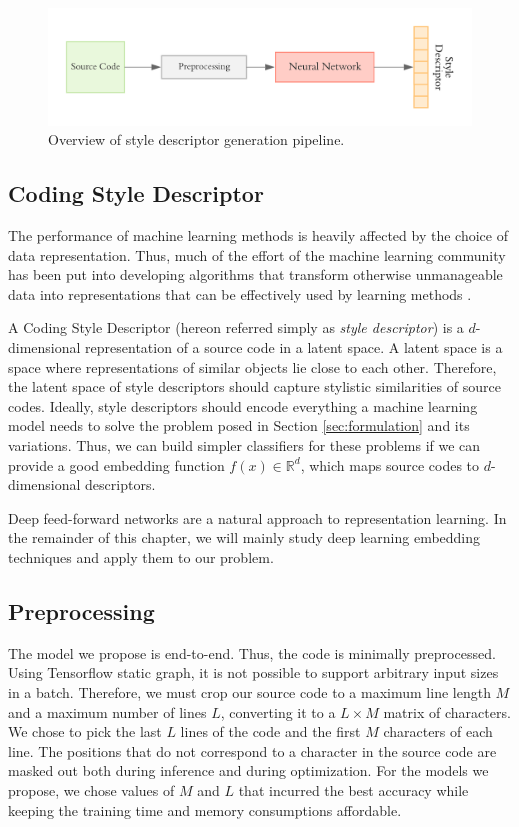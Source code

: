 \begin{figure}[ht]
	\centering
	\includegraphics[width=\linewidth]{imgs/pipeline.pdf}
	\caption{Overview of style descriptor generation pipeline.}
	\label{fig:overall}
\end{figure}

\subsection{Coding Style Descriptor}\label{sec:descriptor}

The performance of machine learning methods is heavily affected by the choice of data representation. Thus, much of the effort of the machine learning community has been put into developing algorithms that transform otherwise unmanageable data into representations that can be effectively used by learning methods \cite{representation_learning}.

A Coding Style Descriptor (hereon referred simply as \textit{style descriptor}) is a $d$-dimensional representation of a source code in a latent space. A latent space is a space where representations of similar objects lie close to each other. Therefore, the latent space of style descriptors should capture stylistic similarities of source codes. Ideally, style descriptors should encode everything a machine learning model needs to solve the problem posed in Section \ref{sec:formulation} and its variations. Thus, we can build simpler classifiers for these problems if we can provide a good embedding function $f(x) \in \mathbb{R}^d$, which maps source codes to $d$-dimensional descriptors.

Deep feed-forward networks are a natural approach to representation learning. In the remainder of this chapter, we will mainly study deep learning embedding techniques and apply them to our problem.

\subsection{Preprocessing}\label{sec:preprocessing}

The model we propose is end-to-end. Thus, the code is minimally preprocessed. Using Tensorflow static graph, it is not possible to support arbitrary input sizes in a batch. Therefore, we must crop our source code to a maximum line length $M$ and a maximum number of lines $L$, converting it to a $L \times M$ matrix of characters. We chose to pick the last $L$ lines of the code and the first $M$ characters of each line. The positions that do not correspond to a character in the source code are masked out both during inference and during optimization. For the models we propose, we chose values of $M$ and $L$ that incurred the best accuracy while keeping the training time and memory consumptions affordable.

